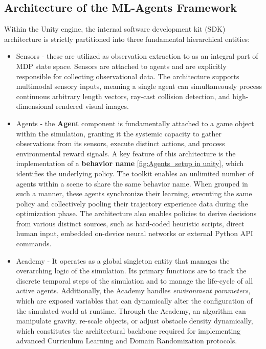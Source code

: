 \subsection{Architecture of the ML-Agents Framework}
Within the Unity engine, the internal software development kit (SDK) architecture is strictly partitioned into three fundamental hierarchical entities:
\begin{itemize}
	\item Sensors - these are utilized as observation extraction to as an integral part of MDP state space. Sensors are attached to agents and are explicitly responsible for collecting observational data. The architecture supports multimodal sensory inputs, meaning a single agent can simultaneously process continuous arbitrary length vectors, ray-cast collision detection, and high-dimensional rendered visual images.  
	\item Agents - the \textbf{Agent} component is fundamentally attached to a game object within the simulation, granting it the systemic capacity to gather observations from its sensors, execute distinct actions, and process environmental reward signals. A key feature of this architecture is the implementation of a \textbf{behavior name} \ref{fig:Agents_setup in unity}, which identifies the underlying policy. The toolkit enables an unlimited number of agents within a scene to share the same behavior name. When grouped in such a manner, these agents synchronize their learning, executing the same policy and collectively pooling their trajectory experience data during the optimization phase. The architecture also enables policies to derive decisions from various distinct sources, such as hard-coded heuristic scripts, direct human input, embedded on-device neural networks or external Python API commands.
	\item Academy - It operates as a global singleton entity that manages the overarching logic of the simulation. Its primary functions are to track the discrete temporal steps of the simulation and to manage the life-cycle of all active agents. Additionally, the Academy handles \textit{environment parameters}, which are exposed variables that can dynamically alter the configuration of the simulated world at runtime. Through the Academy, an algorithm can manipulate gravity, re-scale objects, or adjust obstacle density dynamically, which constitutes the architectural backbone required for implementing advanced Curriculum Learning and Domain Randomization protocols.
\end{itemize}
